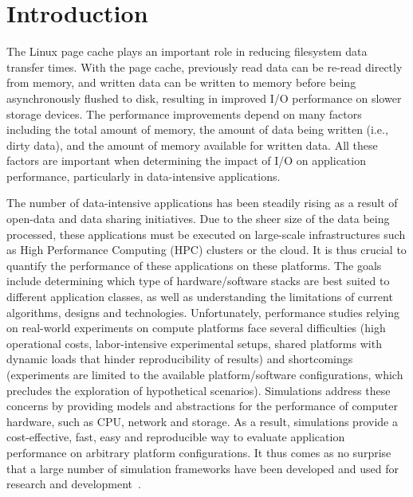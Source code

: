 \documentclass[conference]{IEEEtran}
\begin{document}
    \section{Introduction}

        The Linux page cache plays an important role in
        reducing filesystem data transfer times. With the page cache, previously
        read data can be re-read directly from memory, and written data can be written to
        memory before being asynchronously flushed to disk, resulting in improved I/O performance
        on slower storage devices. The performance improvements
        depend on many factors including the total amount of memory,
        the amount of data being written (i.e., dirty data), and the amount of memory available for
        written data. All these factors are important when determining the impact of I/O on
        application performance, particularly in data-intensive applications.

        The number of data-intensive applications has been steadily rising as a result of
        open-data and data sharing initiatives. Due to the sheer size of the data being
        processed, these applications must be executed on large-scale infrastructures
    such as High Performance Computing (HPC) clusters or the cloud.  It
    is thus crucial to quantify the performance of these applications
    on these platforms. The goals include determining which type of hardware/software
    stacks are best suited to different application classes, as well as
    understanding the limitations of current algorithms, designs and
    technologies. Unfortunately, performance
        studies relying on real-world experiments on compute platforms
        face several difficulties (high operational costs, labor-intensive experimental setups,
        shared platforms with dynamic loads that hinder reproducibility of results) and shortcomings
        (experiments are limited to the available platform/software configurations, which precludes
        the exploration of hypothetical scenarios). 
    Simulations address these concerns by providing models
    and abstractions for the performance of computer hardware, such as
    CPU, network and storage. As a result, simulations provide a
    cost-effective, fast, easy and reproducible way to evaluate
    application performance on arbitrary platform configurations. It thus comes
        as no surprise that a large number of simulation frameworks have been developed and used 
        for research and development~\cite{ optorsim, gridsim, groudsim, cloudsim, nunez2012simcan,nunez2012icancloud, mdcsim, dissect_cf, cloudnetsimplusplus, fognetsimplusplus, casanova2014simgrid, ROSS, casanova2020fgcs}. 
\end{document}
